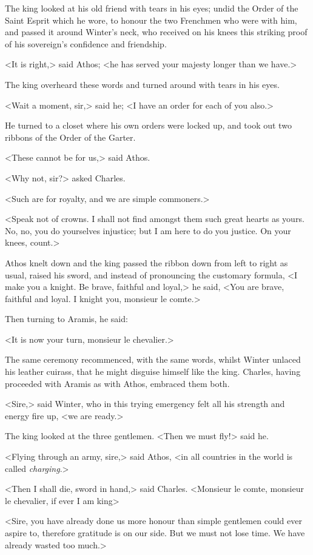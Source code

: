 The king looked at his old friend with tears in his eyes; undid the Order of the Saint Esprit which he wore, to honour the two Frenchmen who were with him, and passed it around Winter's neck, who received on his knees this striking proof of his sovereign's confidence and friendship.

<It is right,> said Athos; <he has served your majesty longer than we have.>

The king overheard these words and turned around with tears in his eyes.

<Wait a moment, sir,> said he; <I have an order for each of you also.>

He turned to a closet where his own orders were locked up, and took out two ribbons of the Order of the Garter.

<These cannot be for us,> said Athos.

<Why not, sir?> asked Charles.

<Such are for royalty, and we are simple commoners.>

<Speak not of crowns. I shall not find amongst them such great hearts as yours. No, no, you do yourselves injustice; but I am here to do you justice. On your knees, count.>

Athos knelt down and the king passed the ribbon down from left to right as usual, raised his sword, and instead of pronouncing the customary formula, <I make you a knight. Be brave, faithful and loyal,> he said, <You are brave, faithful and loyal. I knight you, monsieur le comte.>

Then turning to Aramis, he said:

<It is now your turn, monsieur le chevalier.>

The same ceremony recommenced, with the same words, whilst Winter unlaced his leather cuirass, that he might disguise himself like the king. Charles, having proceeded with Aramis as with Athos, embraced them both.

<Sire,> said Winter, who in this trying emergency felt all his strength and energy fire up, <we are ready.>

The king looked at the three gentlemen. <Then we must fly!> said he.

<Flying through an army, sire,> said Athos, <in all countries in the world is called \textit{charging}.>

<Then I shall die, sword in hand,> said Charles. <Monsieur le comte, monsieur le chevalier, if ever I am king\longdash>

<Sire, you have already done us more honour than simple gentlemen could ever aspire to, therefore gratitude is on our side. But we must not lose time. We have already wasted too much.>

